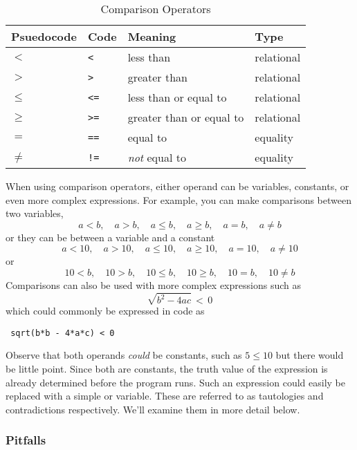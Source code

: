   \begin{table}
    \centering
    \begin{tabular}{llll}
    \hline
    \textbf{Psuedocode} & \textbf{Code} & \textbf{Meaning}       & \textbf{Type} \\
    \hline
    $<$ & \texttt{<}     & less than                & relational \\
    $>$ & \texttt{>}     & greater than             & relational \\
    $\leq$ & \texttt{<=}    & less than or equal to    & relational \\
    $\geq$ & \texttt{>=}    & greater than or equal to & relational \\
    $=$ & \texttt{==}    & equal to                 & equality   \\
    $\neq$ & \texttt{!=}    & \textit{not} equal to    & equality   \\
    \hline
    \end{tabular}
    \caption{Comparison Operators}
    \label{table:comparisonOperators}
  \end{table}

When using comparison operators, either operand can be variables, constants, or even
more complex expressions.  For example, you can make comparisons between two
variables, 
  $$a < b, \quad a > b, \quad a \leq b,\quad a \geq b,\quad a = b,\quad a \neq b$$
or they can be between a variable and a constant
  $$a < 10,\quad a > 10,\quad a \leq 10,\quad a \geq 10,\quad a = 10,\quad a \neq 10$$
or
  $$10 < b,\quad 10 > b,\quad 10 \leq b,\quad 10 \geq b,\quad 10 = b,\quad 10 \neq b$$
Comparisons can also be used with more complex expressions such as
  $$\sqrt{b^2 - 4ac} \, < \, 0$$
which could commonly be expressed in code as 

\texttt{  sqrt(b*b - 4*a*c)   < 0}

Observe that both operands \emph{could} be constants, such as $5 \leq 10$
but there would be little point.  Since both are constants, the truth value of
the expression is already determined before the program runs.  Such an
expression could easily be replaced with a simple \True or \False variable.
These are referred to as tautologies and contradictions respectively.  We'll
examine them in more detail below.

\subsubsection{Pitfalls}


